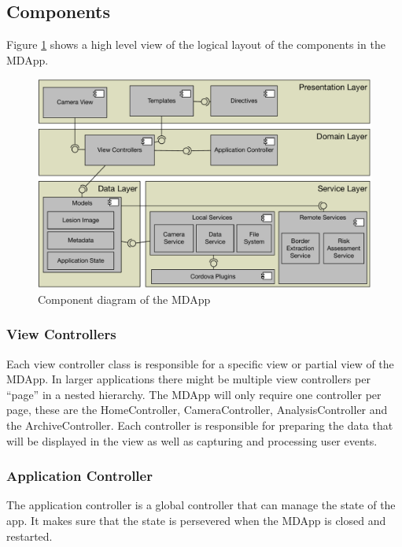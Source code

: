 \subsection{Components}

Figure \ref{fig:comp_dia} shows a high level view of the logical layout of the components in the MDApp.

\begin{figure}[H]
    \centering
    \includegraphics[width=\textwidth,keepaspectratio]{assets/architecture/compontent_diagram.pdf}
    \caption{Component diagram of the MDApp}
    \label{fig:comp_dia}
\end{figure}

\subsubsection{View Controllers}

Each view controller class is responsible for a specific view or partial view of the MDApp. In larger applications there might be multiple view controllers per “page” in a nested hierarchy. The MDApp will only require one controller per page, these are the HomeController, CameraController, AnalysisController and the ArchiveController. Each controller is responsible for preparing the data that will be displayed in the view as well as capturing and processing user events.

\subsubsection{Application Controller}
The application controller is a global controller that can manage the state of the app. It makes sure that the state is persevered when the MDApp is closed and restarted.


